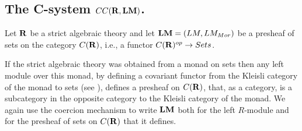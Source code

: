 \documentclass[11pt]{article}
\newcommand{\sr}{\rightarrow}
\newcommand{\rr}{{\bf R}}
\newcommand{\lm}{{\bf LM}}
\begin{document}
\subsection{The C-system $CC(\rr,\lm)$.}
%
Let $\rr$ be a strict algebraic theory and let $\lm=(LM,LM_{Mor})$ be a presheaf of sets on the category $C(\rr)$, i.e., a functor $C(\rr)^{op}\sr Sets$. 

If the strict algebraic theory was obtained from a monad on sets then any left module over this monad, by defining a covariant functor from the Kleisli category of the monad to sets (see \cite[Prop. 5]{HM2010}), defines a presheaf  on $C(\rr)$, that, as a category, is a subcategory in the opposite category to the Kleisli category of the monad. We again use the coercion mechanism to write $\lm$ both for the left $R$-module and for the presheaf of sets on $C(\rr)$ that it defines. 
\end{document}
